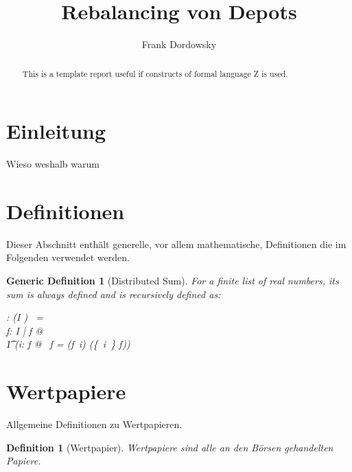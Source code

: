 \documentclass[12pt]{scrartcl}
\newtheorem{genericdef}{Generic Definition}[section]
\newtheorem{zdef}{Definition}[section]
\newcommand{\dsum}{\Sigma}
\begin{document}
\title{Rebalancing von Depots}

\author{Frank Dordowsky}

\maketitle

\begin{abstract}
This is a template report useful if constructs of formal language Z is
used.
\end{abstract}


\section{Einleitung}
\label{sec:einleitung}

Wieso weshalb warum

\section{Definitionen}
\label{sec:definitionen}
Dieser Abschnitt enthält generelle, vor allem mathematische,
Definitionen die im Folgenden verwendet werden.


\begin{genericdef}[Distributed Sum]
  \label{zdef:distributed-sum}
  For a finite list of real numbers, its sum is always defined and is
  recursively defined as:
  \begin{gendef}[I]
    \dsum : (I \ffun \Arithmos) \fun \Arithmos
    \where
    \dsum~\emptyset = \azero \\
    \forall f: I \ffun \Arithmos | f \neq \emptyset @ \\
    \t1 (\exists i: \dom f @ \dsum~f = (f~i) \aplus
    \dsum(\{~i~\} \ndres f))
  \end{gendef}
\end{genericdef}

\section{Wertpapiere}
\label{sec:wertpapiere}
Allgemeine Definitionen zu Wertpapieren.

\begin{zdef}[Wertpapier]
  \label{zdef:wertpapier}
  Wertpapiere sind alle an den Börsen gehandelten Papiere.
  \begin{zed}
    [Wertpapier]
  \end{zed}
\end{zdef}
\end{document}

